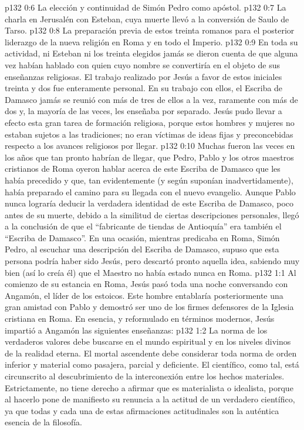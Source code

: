 \vs p132 0:6 La elección y continuidad de Simón Pedro como apóstol.
\vs p132 0:7 La charla en Jerusalén con Esteban, cuya muerte llevó a la conversión de Saulo de Tarso.
\vs p132 0:8 La preparación previa de estos treinta romanos para el posterior liderazgo de la nueva religión en Roma y en todo el Imperio.
\vs p132 0:9 \pc En toda su actividad, ni Esteban ni los treinta elegidos jamás se dieron cuenta de que alguna vez habían hablado con quien cuyo nombre se convertiría en el objeto de sus enseñanzas religiosas. El trabajo realizado por Jesús a favor de estos iniciales treinta y dos fue enteramente personal. En su trabajo con ellos, el Escriba de Damasco jamás se reunió con más de tres de ellos a la vez, raramente con más de dos y, la mayoría de las veces, les enseñaba por separado. Jesús pudo llevar a efecto esta gran tarea de formación religiosa, porque estos hombres y mujeres no estaban sujetos a las tradiciones; no eran víctimas de ideas fijas y preconcebidas respecto a los avances religiosos por llegar.
\vs p132 0:10 Muchas fueron las veces en los años que tan pronto habrían de llegar, que Pedro, Pablo y los otros maestros cristianos de Roma oyeron hablar acerca de este Escriba de Damasco que les había precedido y que, tan evidentemente (y según suponían inadvertidamente), había preparado el camino para su llegada con el nuevo evangelio. Aunque Pablo nunca lograría deducir la verdadera identidad de este Escriba de Damasco, poco antes de su muerte, debido a la similitud de ciertas descripciones personales, llegó a la conclusión de que el “fabricante de tiendas de Antioquía” era también el “Escriba de Damasco”. En una ocasión, mientras predicaba en Roma, Simón Pedro, al escuchar una descripción del Escriba de Damasco, supuso que esta persona podría haber sido Jesús, pero descartó pronto aquella idea, sabiendo muy bien (así lo creía él) que el Maestro no había estado nunca en Roma.
\vs p132 1:1 Al comienzo de su estancia en Roma, Jesús pasó toda una noche conversando con Angamón, el líder de los estoicos. Este hombre entablaría posteriormente una gran amistad con Pablo y demostró ser uno de los firmes defensores de la Iglesia cristiana en Roma. En esencia, y reformulado en términos modernos, Jesús impartió a Angamón las siguientes enseñanzas:
\vs p132 1:2 \pc La norma de los verdaderos valores debe buscarse en el mundo espiritual y en los niveles divinos de la realidad eterna. El mortal ascendente debe considerar toda norma de orden inferior y material como pasajera, parcial y deficiente. El científico, como tal, está circunscrito al descubrimiento de la interconexión entre los hechos materiales. Estrictamente, no tiene derecho a afirmar que es materialista o idealista, porque al hacerlo pone de manifiesto su renuncia a la actitud de un verdadero científico, ya que todas y cada una de estas afirmaciones actitudinales son la auténtica esencia de la filosofía.
